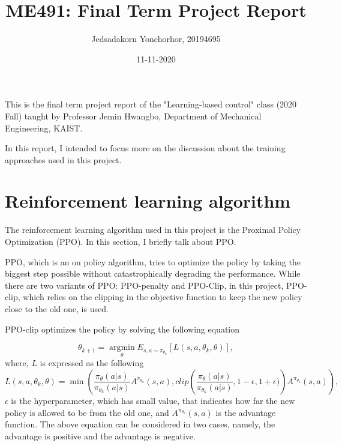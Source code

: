 \documentclass{article}
\title{ME491: Final Term Project Report}
\date{11-11-2020}
\author{Jedsadakorn Yonchorhor, 20194695}
\begin{document}
\maketitle
{}

    This is the final term project report of the "Learning-based control" class (2020 Fall) taught by Professor Jemin Hwangbo, 
Department of Mechanical Engineering, KAIST.

    In this report, I intended to focus more on the discussion about the training approaches used in this project.

\section{Reinforcement learning algorithm}
    The reinforcement learning algorithm used in this project is the Proximal Policy Optimization (PPO). In this section, I briefly talk about PPO.

    PPO, which is an on policy algorithm, 
    tries to optimize the policy by taking the biggest step possible without catastrophically degrading the performance.
    While there are two variants of PPO: PPO-penalty and PPO-Clip, in this project, PPO-clip, 
    which relies on the clipping in the objective function to keep the new policy close to the old one, is used.

    PPO-clip optimizes the policy by solving the following equation

    $$ \theta_{k+1} = \operatorname*{argmin}_\theta E_{s, a\sim\pi_{\theta_k}}[L(s, a, \theta_k, \theta)], $$
    where, $L$ is expressed as the following
    $$ L(s, a, \theta_k, \theta) = \min\left(\frac{\pi_{\theta}(a|s)}{\pi_{\theta_k}(a|s)}
                                                A^{\pi_{\theta_k}}(s, a), 
                                            clip\left(
                                            \frac{\pi_{\theta}(a|s)}{\pi_{\theta_k}(a|s)}, 
                                                                                1-\epsilon, 
                                                                                1+\epsilon)
                                            \right)
                                            A^{\pi_{\theta_k}}(s, a)
                                        \right), $$
    $\epsilon$ is the hyperparameter, which has small value, that indicates how far the new policy is allowed to be from the old one, 
    and $A^{\pi_{\theta_k}}(s, a)$ is the advantage function. The above equation can be considered in two cases, namely, 
    the advantage is positive and the advantage is negative. 
\end{document}
